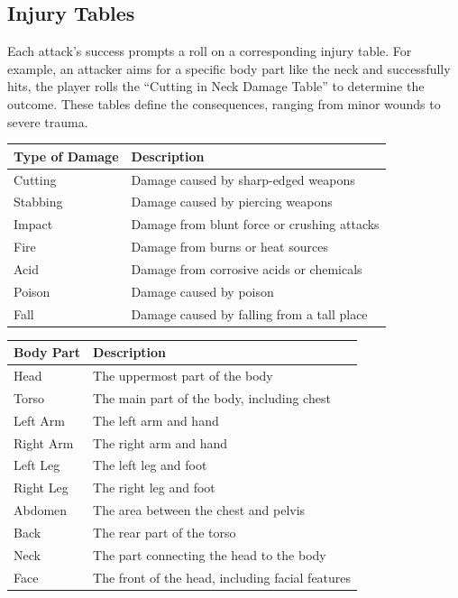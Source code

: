 \hypertarget{injury-tables}{%
\subsection{Injury Tables}\label{injury-tables}}

Each attack's success prompts a roll on a corresponding injury table.
For example, an attacker aims for a specific body part like the neck and
successfully hits, the player rolls the ``Cutting in Neck Damage Table''
to determine the outcome. These tables define the consequences, ranging
from minor wounds to severe trauma.

\begin{longtable}[]{@{}ll@{}}
\toprule
Type of Damage & Description \\
\midrule
\endhead
Cutting & Damage caused by sharp-edged weapons \\
Stabbing & Damage caused by piercing weapons \\
Impact & Damage from blunt force or crushing attacks \\
Fire & Damage from burns or heat sources \\
Acid & Damage from corrosive acids or chemicals \\
Poison & Damage caused by poison \\
Fall & Damage caused by falling from a tall place \\
\bottomrule
\end{longtable}

\begin{longtable}[]{@{}ll@{}}
\toprule
Body Part & Description \\
\midrule
\endhead
Head & The uppermost part of the body \\
Torso & The main part of the body, including chest \\
Left Arm & The left arm and hand \\
Right Arm & The right arm and hand \\
Left Leg & The left leg and foot \\
Right Leg & The right leg and foot \\
Abdomen & The area between the chest and pelvis \\
Back & The rear part of the torso \\
Neck & The part connecting the head to the body \\
Face & The front of the head, including facial features \\
\bottomrule
\end{longtable}


